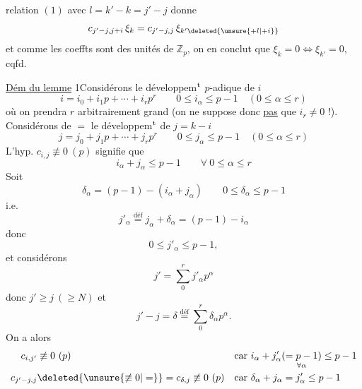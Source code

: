 relation $(1)$ avec $l=k'-k=j'-j$ donne
\[
c_{j'-j,j+i}\,\xi_k=c_{j'-j,j}\,\xi_{k'\deleted{\unsure{+l|+i}}}
\]
et comme les coeffts sont des unités de $\mathbb Z_p$, on en conclut que $\xi_k=0\Longleftrightarrow\xi_{k'}=0$, cqfd.

\uline{Dém du lemme} 1\quad Considérons le développem$^{\rm t}$ $p$-adique de $i$
\[
 i=i_0+i_1p+\cdots+i_rp^r \qquad 0\leq i_\alpha\leq p-1\quad(0\leq\alpha\leq r)
\]
où on prendra $r$ arbitrairement grand (on ne suppose donc \uline{pas} que $i_r\neq0$ !). Considérons de $=$ le développem$^{\rm t}$ de $j=k-i$
\[
 j=j_0+j_1p+\cdots+j_rp^r\qquad 0\leq j_\alpha\leq p-1\quad(0\leq\alpha\leq r)
\]
L'hyp. $c_{i,j}\not\equiv0\ (p)$ signifie que
\[
 i_\alpha+j_\alpha\leq p-1\qquad\forall\ 0\leq\alpha\leq r
\]
Soit \deleted{\unsure{$\delta_\alpha$}}
\[
 \delta_\alpha=(p-1)-(i_\alpha+j_\alpha)\qquad 0\leq\delta_\alpha\leq p-1
\]
i.e.
\[
 j'_\alpha\overset{\text{déf}}{=}j_\alpha+\delta_\alpha=(p-1)-i_\alpha
\]
donc
\[
 0\leq j'_\alpha\leq p-1,
\]
et considérons
\[
 j'=\sum_0^r j'_\alpha p^\alpha
\]
donc $j'\geq j\ (\geq N)$ et
\[
 j'-j=\delta\overset{\text{déf}}{=}\sum_0^r\delta_\alpha p^\alpha.
\]
On a alors 
\[
\begin{aligned}
 c_{i,j'}&\not\equiv0\ (p) &&\text{car }i_\alpha+j'_\alpha\underset{\forall\alpha}{(=p-1)}\leq p-1\\
 c_{j'-j,j}&\deleted{\unsure{\not\equiv0|=}}=c_{\delta,j}\not\equiv0\ (p) &&\text{car }\delta_\alpha+j_\alpha=j'_\alpha\leq p-1
\end{aligned}
\]

